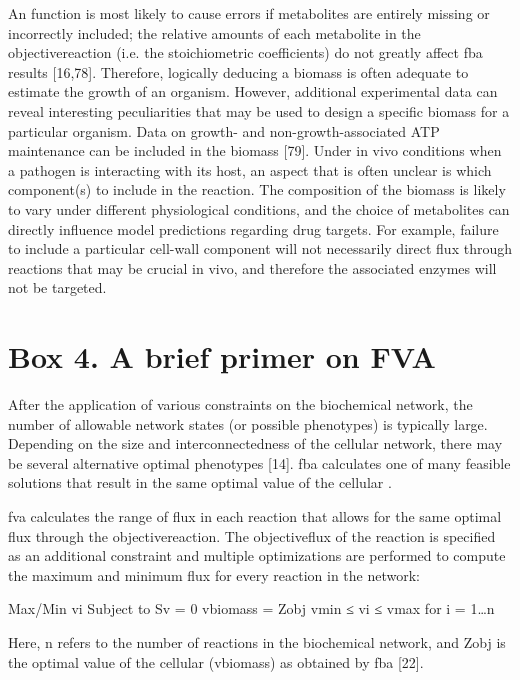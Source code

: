 An  function is most likely to cause 
errors if metabolites are entirely missing or 
incorrectly included; the relative amounts of each 
metabolite in the \gls{objectivereaction} (i.e. the 
stoichiometric coefficients) do not greatly affect 
\gls{fba} results [16,78]. Therefore, logically 
deducing a \gls{biomass} is often adequate 
to estimate the growth of an organism. However, 
additional experimental data can reveal interesting 
peculiarities that may be used to design a specific 
\gls{biomass} for a particular organism. 
Data on growth- and non-growth-associated ATP 
maintenance can be included in the \gls{biomass} [79]. Under in vivo conditions when a 
pathogen is interacting with its host, an aspect 
that is often unclear is which  component(s) 
to include in the reaction. The composition of the 
\gls{biomass} is likely to vary under different 
physiological conditions, and the choice of metabolites 
can directly influence model predictions regarding 
drug targets. For example, failure to include a 
particular cell-wall component will not necessarily 
direct \gls{flux} through reactions that may be crucial in 
vivo, and therefore the associated enzymes will not 
be targeted.

\section{Box 4. A brief primer on FVA}
After the application of various constraints on the 
biochemical network, the number of allowable network 
states (or possible phenotypes) is typically large. 
Depending on the size and interconnectedness of the 
cellular network, there may be several alternative 
optimal phenotypes [14]. \gls{fba} calculates one of many 
feasible solutions that result in the same optimal 
value of the cellular .

\gls{fva} calculates the range of 
\gls{flux} in each reaction that allows for the same optimal 
\gls{flux} through the \gls{objectivereaction}. The \gls{objectiveflux} 
of the reaction is specified as an additional 
constraint and multiple optimizations are performed 
to compute the maximum and minimum flux for every reaction in the network:

Max/Min vi
Subject to	Sv = 0
		vbiomass = Zobj
		vmin ≤ vi ≤ vmax	for i = 1…n

Here, n refers to the number of reactions in the 
biochemical network, and Zobj is the optimal value 
of the cellular  (vbiomass) as obtained by \gls{fba} [22].


\singlespacing
\printbibliography



